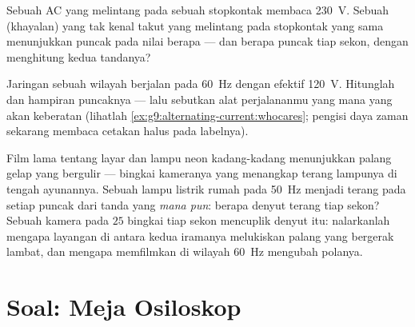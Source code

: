\begin{exercise}[$\star\star$]\label{exo:g9:alternating-current:10}
Sebuah  AC yang melintang pada sebuah stopkontak membaca
\qty{230}{V}. Sebuah  (khayalan) yang tak kenal takut yang
melintang pada stopkontak yang sama menunjukkan puncak pada nilai
berapa --- dan berapa puncak tiap sekon, dengan menghitung kedua
tandanya?
\end{exercise}

\begin{exercise}[$\star\star$]\label{exo:g9:alternating-current:11}
Jaringan sebuah wilayah berjalan pada \qty{60}{Hz} dengan efektif
\qty{120}{V}. Hitunglah  dan hampiran  puncaknya ---
lalu sebutkan alat perjalananmu yang mana yang akan keberatan (lihatlah
\cref{ex:g9:alternating-current:whocares}; pengisi daya zaman sekarang
membaca cetakan halus pada labelnya).
\end{exercise}

\begin{exercise}[$\star\star\star$]\label{exo:g9:alternating-current:12}
Film lama tentang layar dan lampu neon kadang-kadang menunjukkan palang
gelap yang bergulir --- bingkai kameranya yang menangkap terang lampunya
di tengah ayunannya. Sebuah lampu listrik rumah pada \qty{50}{Hz}
menjadi terang pada setiap puncak dari tanda yang \emph{mana pun}:
berapa denyut terang tiap sekon? Sebuah kamera pada $25$ bingkai tiap
sekon mencuplik denyut itu: nalarkanlah mengapa layangan di antara
kedua iramanya melukiskan palang yang bergerak lambat, dan mengapa
memfilmkan di wilayah \qty{60}{Hz} mengubah polanya.
\end{exercise}

\section{Soal: Meja Osiloskop}

